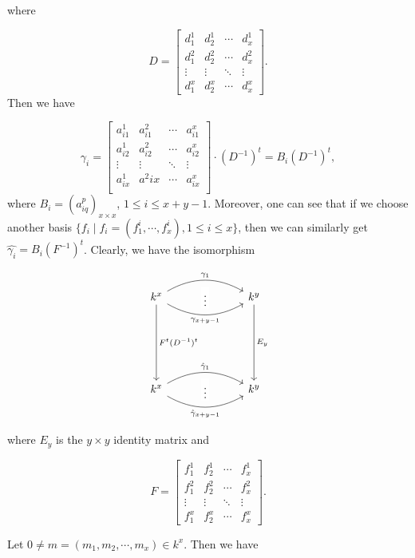 \documentclass[a4paper,12pt]{amsart}
\begin{document}
 where

\[ D=\begin{bmatrix}
d^1_1 & d^1_2 & \cdots & d^1_x\\
d^2_1 & d^2_2 & \cdots & d^2_x\\
\vdots & \vdots & \ddots & \vdots \\
d^x_1 & d^x_2 & \cdots & d^x_x
\end{bmatrix}.  \]
Then we have

 
\[ \gamma_i=\begin{bmatrix}
a^1_{i1} & a^2_{i1} & \cdots & a^x_{i1}\\
a^1_{i2} & a^2_{i2} & \cdots & a^x_{i2}\\
\vdots & \vdots & \ddots & \vdots\\
a^1_{ix} & a^2{ix} & \cdots & a^x_{ix}\\
\end{bmatrix} \cdot (D^{-1})^t=B_i (D^{-1})^t, \]
where $B_i=(a^p_{iq})_{x\times x}$, $1\leq i\leq x+y-1$. Moreover, one can see that if we choose another basis $\{f_i\mid f_i=(f^i_1,\cdots,f^i_x), 1\leq i\leq x\}$, then we can similarly get $\hat{\gamma_i}=B_i (F^{-1})^t$. Clearly, we have the isomorphism 

\[ \begin{tikzcd}[sep=2.4cm]
  k^x 
  \arrow[d, "F^t(D^{-1})^t"]
  \arrow[r, draw=none, "{\vdots}" description]
    \arrow[r, bend left,        "\gamma_1"]
    \arrow[r, bend right, swap, "\gamma_{x+y-1}"]
    &
    k^y \arrow[d, "E_y"] \\   
    k^x
  \arrow[r, draw=none, "{\vdots}" description]
    \arrow[r, bend left,        "\hat{\gamma}_1"]
    \arrow[r, bend right, swap, "\hat{\gamma}_{x+y-1}"]
    &
    k^y 
\end{tikzcd} \]

where $E_y$ is the $y\times y$ identity matrix and 

\[F=\begin{bmatrix}
f^1_1 & f^1_2 & \cdots & f^1_x\\
f^2_1 & f^2_2 & \cdots & f^2_x\\
\vdots & \vdots & \ddots & \vdots \\
f^x_1 & f^x_2 & \cdots & f^x_x
\end{bmatrix}. \]

 Let $0\neq m=(m_1,m_2,\cdots,m_x)\in k^x$. Then we have 
 
\end{document}
